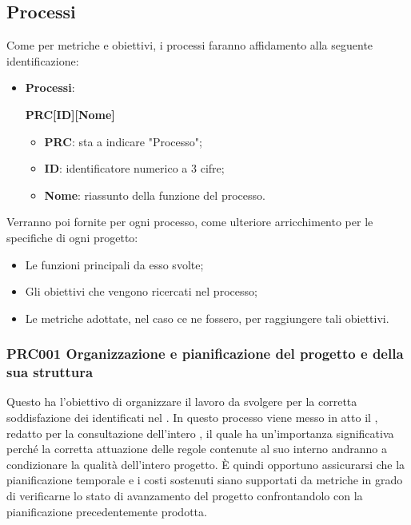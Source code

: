 \documentclass[../piano-di-qualifica.tex]{subfiles}
\begin{document}
\subsection{Processi}%
\label{sub:processi}
Come per metriche e obiettivi, i processi faranno affidamento alla seguente identificazione:
\begin{itemize}
    \item \textbf{Processi}: 
    \begin{center}
        \centering
        \textbf{PRC[ID][Nome]}
    \end{center}
    \begin{itemize}
        \item \textbf{PRC}: sta a indicare "Processo";
        \item \textbf{ID}: identificatore numerico a 3 cifre;
        \item \textbf{Nome}: riassunto della funzione del processo.
    \end{itemize}
\end{itemize}
Verranno poi fornite per ogni processo, come ulteriore arricchimento per le specifiche di ogni progetto:
\begin{itemize}
    \item Le funzioni principali da esso svolte;
    \item Gli obiettivi che vengono ricercati nel processo;
    \item Le metriche adottate, nel caso ce ne fossero, per raggiungere tali obiettivi.
\end{itemize}

\subsubsection{PRC001 Organizzazione e pianificazione del progetto e della sua struttura}%
\label{sub:organizzazione_e_pianificazione_del_progetto_e_della_sua_struttura}
Questo  ha l'obiettivo di organizzare il lavoro da svolgere per la corretta soddisfazione dei  identificati nel .
In questo processo viene messo in atto il , redatto per la consultazione dell'intero , il quale ha un'importanza significativa perché la corretta attuazione delle regole contenute al suo interno andranno a condizionare la qualità dell'intero progetto.
È quindi opportuno assicurarsi che la pianificazione temporale e i costi sostenuti siano supportati da metriche in grado di verificarne lo stato di avanzamento del progetto confrontandolo con la pianificazione precedentemente prodotta.
\end{document}
